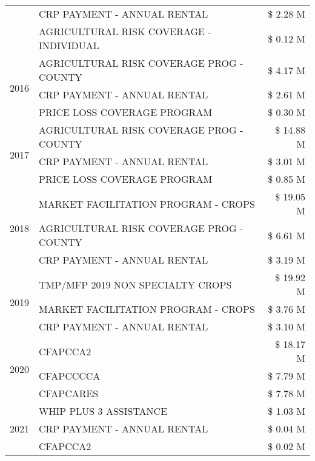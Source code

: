 \begin{tabular}{llr}
 & CRP PAYMENT - ANNUAL RENTAL & \$ 2.28 M \\
 & AGRICULTURAL RISK COVERAGE - INDIVIDUAL & \$ 0.12 M \\
\cline{1-3}
\multirow[t]{3}{*}{2016} & AGRICULTURAL RISK COVERAGE PROG - COUNTY & \$ 4.17 M \\
 & CRP PAYMENT - ANNUAL RENTAL & \$ 2.61 M \\
 & PRICE LOSS COVERAGE PROGRAM & \$ 0.30 M \\
\cline{1-3}
\multirow[t]{3}{*}{2017} & AGRICULTURAL RISK COVERAGE PROG - COUNTY & \$ 14.88 M \\
 & CRP PAYMENT - ANNUAL RENTAL & \$ 3.01 M \\
 & PRICE LOSS COVERAGE PROGRAM & \$ 0.85 M \\
\cline{1-3}
\multirow[t]{3}{*}{2018} & MARKET FACILITATION PROGRAM - CROPS & \$ 19.05 M \\
 & AGRICULTURAL RISK COVERAGE PROG - COUNTY & \$ 6.61 M \\
 & CRP PAYMENT - ANNUAL RENTAL & \$ 3.19 M \\
\cline{1-3}
\multirow[t]{3}{*}{2019} & TMP/MFP 2019 NON SPECIALTY CROPS & \$ 19.92 M \\
 & MARKET FACILITATION PROGRAM - CROPS & \$ 3.76 M \\
 & CRP PAYMENT - ANNUAL RENTAL & \$ 3.10 M \\
\cline{1-3}
\multirow[t]{3}{*}{2020} & CFAPCCA2 & \$ 18.17 M \\
 & CFAPCCCCA & \$ 7.79 M \\
 & CFAPCARES & \$ 7.78 M \\
\cline{1-3}
\multirow[t]{3}{*}{2021} & WHIP PLUS 3 ASSISTANCE & \$ 1.03 M \\
 & CRP PAYMENT - ANNUAL RENTAL & \$ 0.04 M \\
 & CFAPCCA2 & \$ 0.02 M \\
\cline{1-3}
\bottomrule
\end{tabular}

